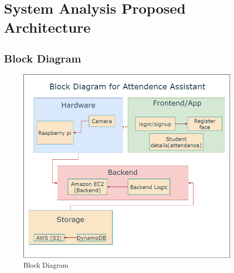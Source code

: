 \documentclass[openany]{report}
\begin{document}
\chapter{System Analysis Proposed Architecture}

\section{Block Diagram}
\begin{figure}[H]
    \centering
    \includegraphics[width=.75\textwidth]{../imgs/block diagram.png}
    \caption{Block Diagram}
\end{figure}
\end{document}
